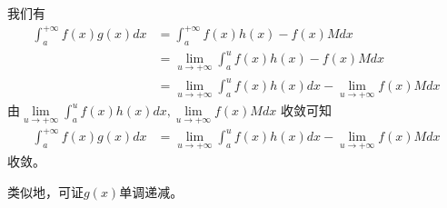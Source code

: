 \documentclass{article}
\begin{document}
我们有
\begin{align*}
  \int_{a}^{+\infty} f(x) g(x) dx
   & = \int_{a}^{+\infty} f(x) h(x) - f(x) M dx                                                      \\
   & = \lim\limits_{u \to +\infty} \int_{a}^{u} f(x) h(x) - f(x) M dx                                \\
   & = \lim\limits_{u \to +\infty} \int_{a}^{u} f(x) h(x) dx - \lim\limits_{u \to +\infty} f(x) M dx
\end{align*}
由$\lim\limits_{u \to +\infty} \int_{a}^{u} f(x) h(x) dx, \lim\limits_{u \to +\infty} f(x) M dx$
收敛可知
\begin{align*}
  \int_{a}^{+\infty} f(x) g(x) dx
   & = \lim\limits_{u \to +\infty} \int_{a}^{u} f(x) h(x) dx - \lim\limits_{u \to +\infty} f(x) M dx
\end{align*}
收敛。

类似地，可证$g(x)$单调递减。
\end{document}
